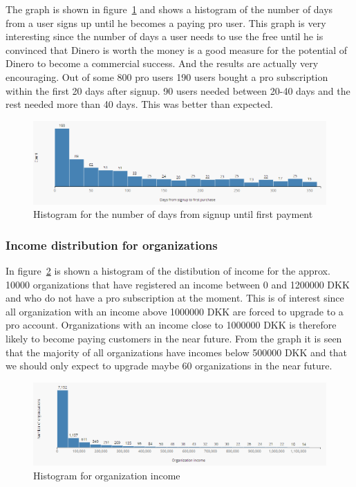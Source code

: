 \documentclass{acm_proc_article-sp}
\begin{document}
The graph is shown in figure~\ref{fig:days-after-signup} and shows a histogram of the number of days from a user signs up until he becomes a paying pro user. This graph is very interesting since the number of days a user needs to use the free until he is convinced that Dinero is worth the money is a good measure for the potential of Dinero to become a commercial success. And the results are actually very encouraging. Out of some 800 pro users 190 users bought a pro subscription within the first 20 days after signup. 90 users needed between 20-40 days and the rest needed more than 40 days. This was better than expected.

\begin{figure}
    \centering
    \includegraphics[width=\columnwidth]{days-after-signup-histogram.png}
    \caption{Histogram for the number of days from signup until first payment}
    \label{fig:days-after-signup}
\end{figure}


\subsubsection{Income distribution for organizations}

In figure~\ref{fig:organization-income} is shown a histogram of the distibution of income for the approx. 10000 organizations that have registered an income between 0 and 1200000 DKK and who do not have a pro subscription at the moment. This is of interest since all organization with an income above 1000000 DKK are forced to upgrade to a pro account. Organizations with an income close to 1000000 DKK is therefore likely to become paying customers in the near future. From the graph it is seen that the majority of all organizations have incomes below 500000 DKK and that we should only expect to upgrade maybe 60 organizations in the near future.

\begin{figure}
    \centering
    \includegraphics[width=\columnwidth]{income.png}
    \caption{Histogram for organization income}
    \label{fig:organization-income}
\end{figure}
\end{document}
